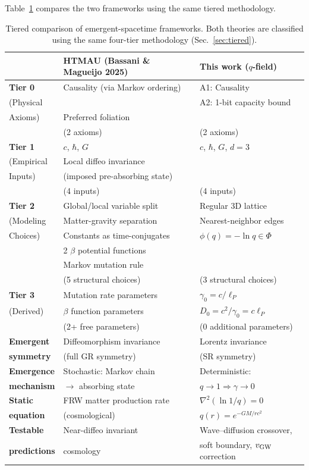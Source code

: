 \documentclass[aps,prd,twocolumn,showpacs,superscriptaddress,preprintnumbers]{revtex4-2}
\begin{document}
Table~\ref{tab:compare_htmau} compares the two frameworks using the same tiered methodology.

\begin{table}[h]
\centering
\caption{Tiered comparison of emergent-spacetime frameworks. Both theories are classified using the same four-tier methodology (Sec.~\ref{sec:tiered}).}
\label{tab:compare_htmau}
\begin{tabular}{p{}p{}p{}}
\toprule
& \textbf{HTMAU (Bassani \& Magueijo 2025)} & \textbf{This work ($q$-field)} \\
\midrule
\textbf{Tier 0} & Causality (via Markov ordering) & A1: Causality \\
(Physical & & A2: 1-bit capacity bound \\
Axioms) & Preferred foliation & \\
& (2 axioms) & (2 axioms) \\
\midrule
\textbf{Tier 1} & $c$, $\hbar$, $G$ & $c$, $\hbar$, $G$, $d=3$ \\
(Empirical & Local diffeo invariance & \\
Inputs) & (imposed pre-absorbing state) & \\
& (4 inputs) & (4 inputs) \\
\midrule
\textbf{Tier 2} & Global/local variable split & Regular 3D lattice \\
(Modeling & Matter-gravity separation & Nearest-neighbor edges \\
Choices) & Constants as time-conjugates & $\phi(q)=-\ln q\in\Phi$ \\
& 2 $\beta$ potential functions & \\
& Markov mutation rule & \\
& (5 structural choices) & (3 structural choices) \\
\midrule
\textbf{Tier 3} & Mutation rate parameters & $\gamma_0=c/\ell_P$ \\
(Derived) & $\beta$ function parameters & $D_0=c^2/\gamma_0=c\ell_P$ \\
& (2+ free parameters) & (0 additional parameters) \\
\midrule
\textbf{Emergent} & Diffeomorphism invariance & Lorentz invariance \\
\textbf{symmetry} & (full GR symmetry) & (SR symmetry) \\
\midrule
\textbf{Emergence} & Stochastic: Markov chain & Deterministic: \\
\textbf{mechanism} & $\to$ absorbing state & $q\to1 \Rightarrow \gamma\to0$ \\
\midrule
\textbf{Static} & FRW matter production rate & $\nabla^2(\ln 1/q)=0$ \\
\textbf{equation} & (cosmological) & $q(r)=e^{-GM/rc^2}$ \\
\midrule
\textbf{Testable} & Near-diffeo invariant & Wave--diffusion crossover, \\
\textbf{predictions} & cosmology & soft boundary, $v_{\rm GW}$ correction \\
\bottomrule
\end{tabular}
\end{table}
\end{document}
